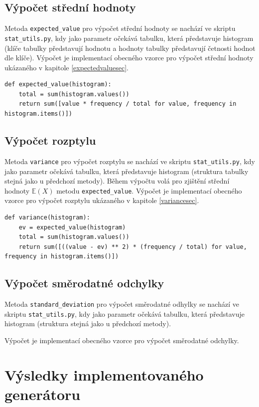 \documentclass[12pt, a4paper]{article}
\let\oldsection\section
\renewcommand\section{\clearpage\oldsection}
\begin{document}
    \subsection{Výpočet střední hodnoty}
    Metoda \texttt{expected\_value} pro výpočet střední hodnoty se nachází ve skriptu \texttt{stat\_utils.py}, kdy jako parametr očekává tabulku,
    která představuje histogram (klíče tabulky představují hodnotu a hodnoty tabulky představují četnosti hodnot dle klíče).
    Výpočet je implementací obecného vzorce pro výpočet střední hodnoty ukázaného v kapitole \ref{expectedvaluesec}.

    \begin{lstlisting}
def expected_value(histogram):
    total = sum(histogram.values())
    return sum([value * frequency / total for value, frequency in histogram.items()])
    \end{lstlisting}
    
    \subsection{Výpočet rozptylu}
    Metoda \texttt{variance} pro výpočet rozptylu se nachází ve skriptu \texttt{stat\_utils.py}, kdy jako parametr očekává tabulku,
    která představuje histogram (struktura tabulky stejná jako u předchozí metody).
    Během výpočtu volá pro zjištění střední hodnoty $\mathbb{E}(X)$ metodu \texttt{expected\_value}.
    Výpočet je implementací obecného vzorce pro výpočet rozptylu ukázaného v kapitole \ref{variancesec}.

    \begin{lstlisting}
def variance(histogram):
    ev = expected_value(histogram)
    total = sum(histogram.values())
    return sum([((value - ev) ** 2) * (frequency / total) for value, frequency in histogram.items()])
    \end{lstlisting}

    \subsection{Výpočet směrodatné odchylky}
    Metoda \texttt{standard\_deviation} pro výpočet směrodatné odhylky se nachází ve skriptu \texttt{stat\_utils.py}, kdy jako parametr očekává tabulku,
    která představuje histogram (struktura stejná jako u předchozí metody).

    Výpočet je implementací obecného vzorce pro výpočet směrodatné odchylky.
    
    \section{Výsledky implementovaného generátoru}
\end{document}

